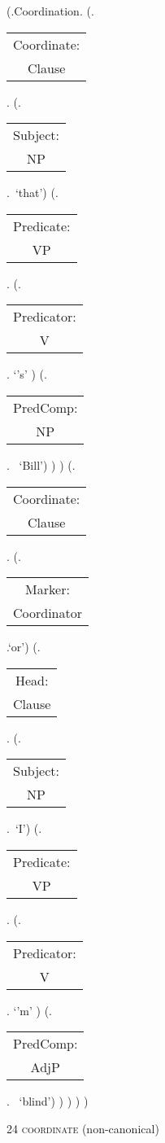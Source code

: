 \documentclass[12pt,letterpaper]{article}
\begin{document}
\begin{figure}
	\begin{center}
		\begin{parsetree}
			(.Coordination.
			(.\begin{tabular}{c}Coordinate:\\Clause\end{tabular}.
			(.\begin{tabular}{c}Subject:\\NP\end{tabular}.~`that')
			(.\begin{tabular}{c}Predicate:\\VP\end{tabular}.
			(.\begin{tabular}{c}Predicator:\\V\end{tabular}. `{'s}' )
			(.\begin{tabular}{c}PredComp:\\NP\end{tabular}.~ 
			`Bill')
			)
			)
			(.\begin{tabular}{c}Coordinate:\\Clause\end{tabular}.
			(.\begin{tabular}{c}Marker:\\Coordinator\end{tabular}.`or')
			(.\begin{tabular}{c}Head:\\Clause\end{tabular}.
			(.\begin{tabular}{c}Subject:\\NP\end{tabular}.~`I')
			(.\begin{tabular}{c}Predicate:\\VP\end{tabular}.
			(.\begin{tabular}{c}Predicator:\\V\end{tabular}. `{'m}' )
			(.\begin{tabular}{c}PredComp:\\AdjP\end{tabular}.~ 
			`blind')
			)
			)
			)
			)
			
			\hfill \break\hfill \break
		\end{parsetree}
		24 \textsc{coordinate} (non-canonical)
	\end{center}
\end{figure}
\clearpage
\end{document}
